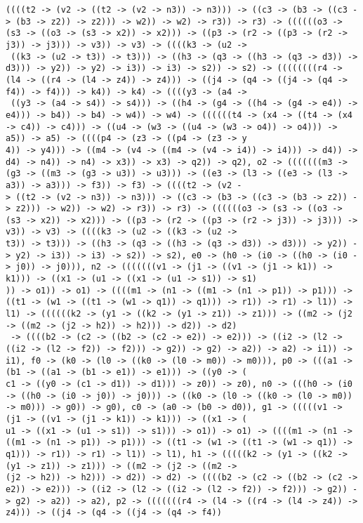 \documentclass[11pt,oneside,a4paper]{report}
\begin{document}
\begin{lstlisting}[breaklines=true,caption={The output of an exponential type},label=lst:appedix:bigexp]
 ((((t2 -> (v2 -> ((t2 -> (v2 -> n3)) -> n3))) -> ((c3 -> (b3 -> ((c3 -> (b3 -> z2)) -> z2))) -> w2)) -> w2) -> r3)) -> r3) -> ((((((o3 -> (s3 -> ((o3 -> (s3 -> x2)) -> x2))) -> ((p3 -> (r2 -> ((p3 -> (r2 -> j3)) -> j3))) -> v3)) -> v3) -> ((((k3 -> (u2 ->
 ((k3 -> (u2 -> t3)) -> t3))) -> ((h3 -> (q3 -> ((h3 -> (q3 -> d3)) -> d3))) -> y2)) -> y2) -> i3)) -> i3) -> s2)) -> s2) -> ((((((((r4 -> (l4 -> ((r4 -> (l4 -> z4)) -> z4))) -> ((j4 -> (q4 -> ((j4 -> (q4 -> f4)) -> f4))) -> k4)) -> k4) -> ((((y3 -> (a4 ->
 ((y3 -> (a4 -> s4)) -> s4))) -> ((h4 -> (g4 -> ((h4 -> (g4 -> e4)) -> e4))) -> b4)) -> b4) -> w4)) -> w4) -> ((((((t4 -> (x4 -> ((t4 -> (x4 -> c4)) -> c4))) -> ((u4 -> (w3 -> ((u4 -> (w3 -> o4)) -> o4))) -> a5)) -> a5) -> ((((p4 -> (z3 -> ((p4 -> (z3 -> y
4)) -> y4))) -> ((m4 -> (v4 -> ((m4 -> (v4 -> i4)) -> i4))) -> d4)) -> d4) -> n4)) -> n4) -> x3)) -> x3) -> q2)) -> q2), o2 -> (((((((m3 -> (g3 -> ((m3 -> (g3 -> u3)) -> u3))) -> ((e3 -> (l3 -> ((e3 -> (l3 -> a3)) -> a3))) -> f3)) -> f3) -> ((((t2 -> (v2 -
> ((t2 -> (v2 -> n3)) -> n3))) -> ((c3 -> (b3 -> ((c3 -> (b3 -> z2)) -> z2))) -> w2)) -> w2) -> r3)) -> r3) -> ((((((o3 -> (s3 -> ((o3 -> (s3 -> x2)) -> x2))) -> ((p3 -> (r2 -> ((p3 -> (r2 -> j3)) -> j3))) -> v3)) -> v3) -> ((((k3 -> (u2 -> ((k3 -> (u2 ->
t3)) -> t3))) -> ((h3 -> (q3 -> ((h3 -> (q3 -> d3)) -> d3))) -> y2)) -> y2) -> i3)) -> i3) -> s2)) -> s2), e0 -> (h0 -> (i0 -> ((h0 -> (i0 -> j0)) -> j0))), n2 -> (((((((v1 -> (j1 -> ((v1 -> (j1 -> k1)) -> k1))) -> ((x1 -> (u1 -> ((x1 -> (u1 -> s1)) -> s1)
)) -> o1)) -> o1) -> ((((m1 -> (n1 -> ((m1 -> (n1 -> p1)) -> p1))) -> ((t1 -> (w1 -> ((t1 -> (w1 -> q1)) -> q1))) -> r1)) -> r1) -> l1)) -> l1) -> ((((((k2 -> (y1 -> ((k2 -> (y1 -> z1)) -> z1))) -> ((m2 -> (j2 -> ((m2 -> (j2 -> h2)) -> h2))) -> d2)) -> d2)
 -> ((((b2 -> (c2 -> ((b2 -> (c2 -> e2)) -> e2))) -> ((i2 -> (l2 -> ((i2 -> (l2 -> f2)) -> f2))) -> g2)) -> g2) -> a2)) -> a2) -> i1)) -> i1), f0 -> (k0 -> (l0 -> ((k0 -> (l0 -> m0)) -> m0))), p0 -> (((a1 -> (b1 -> ((a1 -> (b1 -> e1)) -> e1))) -> ((y0 -> (
c1 -> ((y0 -> (c1 -> d1)) -> d1))) -> z0)) -> z0), n0 -> (((h0 -> (i0 -> ((h0 -> (i0 -> j0)) -> j0))) -> ((k0 -> (l0 -> ((k0 -> (l0 -> m0)) -> m0))) -> g0)) -> g0), c0 -> (a0 -> (b0 -> d0)), g1 -> (((((v1 -> (j1 -> ((v1 -> (j1 -> k1)) -> k1))) -> ((x1 -> (
u1 -> ((x1 -> (u1 -> s1)) -> s1))) -> o1)) -> o1) -> ((((m1 -> (n1 -> ((m1 -> (n1 -> p1)) -> p1))) -> ((t1 -> (w1 -> ((t1 -> (w1 -> q1)) -> q1))) -> r1)) -> r1) -> l1)) -> l1), h1 -> (((((k2 -> (y1 -> ((k2 -> (y1 -> z1)) -> z1))) -> ((m2 -> (j2 -> ((m2 ->
(j2 -> h2)) -> h2))) -> d2)) -> d2) -> ((((b2 -> (c2 -> ((b2 -> (c2 -> e2)) -> e2))) -> ((i2 -> (l2 -> ((i2 -> (l2 -> f2)) -> f2))) -> g2)) -> g2) -> a2)) -> a2), p2 -> (((((((r4 -> (l4 -> ((r4 -> (l4 -> z4)) -> z4))) -> ((j4 -> (q4 -> ((j4 -> (q4 -> f4))

\end{lstlisting}
\end{document}
